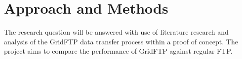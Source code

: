 \section{Approach and Methods}
\paragraph{}
The research question will be answered with use of literature research and analysis of the GridFTP data transfer process within a proof of concept. The project aims to compare the performance of GridFTP against regular FTP. 